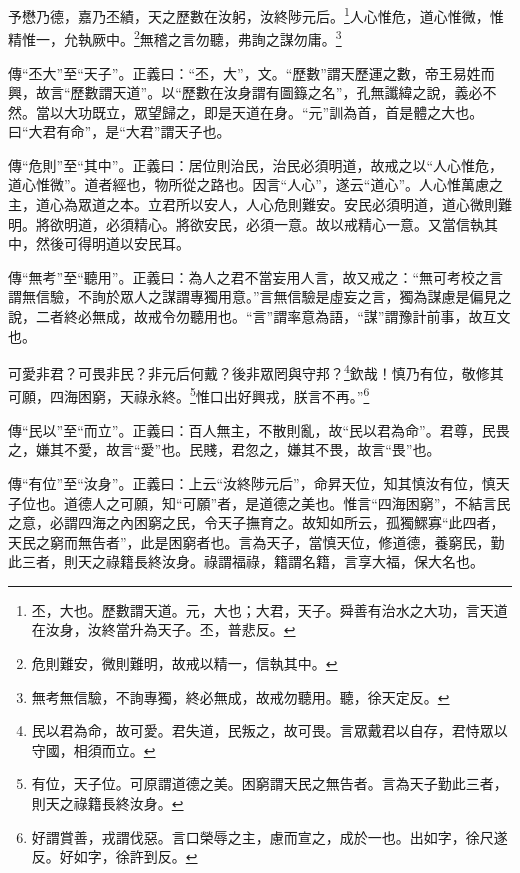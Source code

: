 予懋乃德，嘉乃丕績，天之歷數在汝躬，汝終陟元后。\footnote{丕，大也。歷數謂天道。元，大也；大君，天子。舜善有治水之大功，言天道在汝身，汝終當升為天子。丕，普悲反。}人心惟危，道心惟微，惟精惟一，允執厥中。\footnote{危則難安，微則難明，故戒以精一，信執其中。}無稽之言勿聽，弗詢之謀勿庸。\footnote{無考無信驗，不詢專獨，終必無成，故戒勿聽用。聽，徐天定反。}

{\noindent\zhuan{}\fzbyks 傳“丕大”至“天子”。正義曰：“丕，大”，文。“歷數”謂天歷運之數，帝王易姓而興，故言“歷數謂天道”。以“歷數在汝身謂有圖籙之名”，孔無讖緯之說，義必不然。當以大功既立，眾望歸之，即是天道在身。“元”訓為首，首是體之大也。曰“大君有命”，是“大君”謂天子也。 \par}

{\noindent\zhuan{}\fzbyks 傳“危則”至“其中”。正義曰：居位則治民，治民必須明道，故戒之以“人心惟危，道心惟微”。道者經也，物所從之路也。因言“人心”，遂云“道心”。人心惟萬慮之主，道心為眾道之本。立君所以安人，人心危則難安。安民必須明道，道心微則難明。將欲明道，必須精心。將欲安民，必須一意。故以戒精心一意。又當信執其中，然後可得明道以安民耳。 \par}

{\noindent\zhuan{}\fzbyks 傳“無考”至“聽用”。正義曰：為人之君不當妄用人言，故又戒之：“無可考校之言謂無信驗，不詢於眾人之謀謂專獨用意。”言無信驗是虛妄之言，獨為謀慮是偏見之說，二者終必無成，故戒令勿聽用也。“言”謂率意為語，“謀”謂豫計前事，故互文也。 \par}

可愛非君？可畏非民？非元后何戴？後非眾罔與守邦？\footnote{民以君為命，故可愛。君失道，民叛之，故可畏。言眾戴君以自存，君恃眾以守國，相須而立。}欽哉！慎乃有位，敬修其可願，四海困窮，天祿永終。\footnote{有位，天子位。可原謂道德之美。困窮謂天民之無告者。言為天子勤此三者，則天之祿籍長終汝身。}惟口出好興戎，朕言不再。”\footnote{好謂賞善，戎謂伐惡。言口榮辱之主，慮而宣之，成於一也。出如字，徐尺遂反。好如字，徐許到反。}

{\noindent\zhuan{}\fzbyks 傳“民以”至“而立”。正義曰：百人無主，不散則亂，故“民以君為命”。君尊，民畏之，嫌其不愛，故言“愛”也。民賤，君忽之，嫌其不畏，故言“畏”也。 \par}

{\noindent\zhuan{}\fzbyks 傳“有位”至“汝身”。正義曰：上云“汝終陟元后”，命昇天位，知其慎汝有位，慎天子位也。道德人之可願，知“可願”者，是道德之美也。惟言“四海困窮”，不結言民之意，必謂四海之內困窮之民，令天子撫育之。故知如所云，孤獨鰥寡“此四者，天民之窮而無告者”，此是困窮者也。言為天子，當慎天位，修道德，養窮民，勤此三者，則天之祿籍長終汝身。祿謂福祿，籍謂名籍，言享大福，保大名也。 \par}

